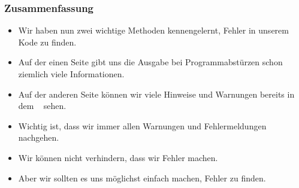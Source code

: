 \documentclass[aspectratio=169,mathserif,notheorems]{beamer}%
\begin{document}
%
\begin{frame}%
\frametitle{Zusammenfassung}%
\begin{itemize}%
\item Wir haben nun zwei wichtige Methoden kennengelernt, Fehler in unserem Kode zu finden.%
\item<2-> Auf der einen Seite gibt uns die Ausgabe bei Programmabstürzen schon ziemlich viele Informationen.%
\item<3-> Auf der anderen Seite können wir viele Hinweise und Warnungen bereits in dem \pycharm\  sehen.%
\item<4-> Wichtig ist, dass wir immer allen Warnungen und Fehlermeldungen nachgehen.%
\item<5-> Wir können nicht verhindern, dass wir Fehler machen.%
\item<6-> Aber wir sollten es uns möglichst einfach machen, Fehler zu finden.%
\end{itemize}%
\end{frame}%
%
\endPresentation%
\end{document}
